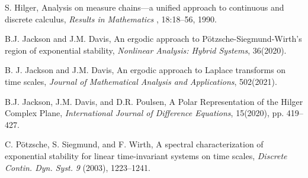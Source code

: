 \documentclass[reqno]{amsart}
\theoremstyle{plain}
\theoremstyle{definition}
\numberwithin{theorem}{section}
\numberwithin{definition}{section}
\numberwithin{prop}{section}
\numberwithin{example}{section}
\begin{document}
\begin{thebibliography}{99}


 S. Hilger, Analysis on measure chains---a unified approach to continuous and discrete calculus, {\it Results in Mathematics} , 18:18--56, 1990.



 B.J. Jackson and J.M. Davis, An ergodic approach to P\"otzsche-Siegmund-Wirth's region of exponential stability, \textit{Nonlinear Analysis: Hybrid Systems}, 36(2020).

 B. J. Jackson and J.M. Davis, An ergodic approach to Laplace transforms on time scales, \textit{Journal of Mathematical Analysis and Applications}, 502(2021).

 B.J. Jackson, J.M. Davis, and D.R. Poulsen, A Polar Representation of the Hilger Complex Plane, \textit{International Journal of Difference Equations}, 15(2020), pp. 419–427.




C. P\"{o}tzsche, S. Siegmund, and F. Wirth, A spectral
characterization of exponential stability for linear time-invariant
systems on time scales, \textit{Discrete Contin. Dyn. Syst.} {\em 9}
(2003), 1223--1241.
\end{thebibliography}
\end{document}
